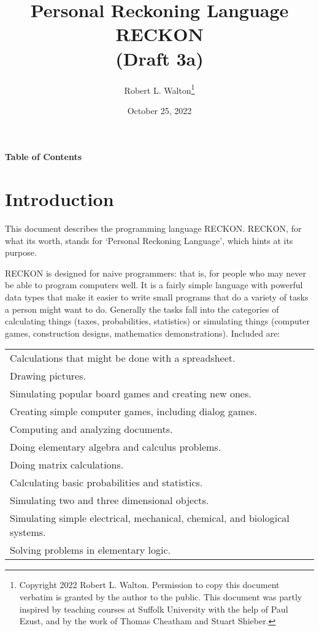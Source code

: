 \documentclass[12pt]{article}
\makeatletter
\renewcommand\tableofcontents{%
    \begin{list}{}%
	     {\setlength{\itemsep}{0in}%
	      \setlength{\topsep}{0in}%
	      \setlength{\parsep}{1ex}%
	      \setlength{\labelwidth}{0in}%
	      \setlength{\baselineskip}{1.5ex}%
	      \setlength{\leftmargin}{0.8in}%
	      \setlength{\rightmargin}{0.8in}}%
    \item\@starttoc{toc}%
    \end{list}}
\makeatother
\begin{document}
        
\title{Personal Reckoning Language\\[2ex]
       RECKON\\[2ex]
       (Draft 3a)}

\author{Robert L. Walton\thanks{Copyright 2022 Robert L. Walton.
Permission to copy this document verbatim is granted by the author
to the public.  This document was partly inspired
by teaching courses at Suffolk University with the help of
Paul Ezust, and by the work of Thomas
Cheatham and Stuart Shieber.}}

\date{October 25, 2022}

\maketitle

\newpage
\begin{center}
\large \bf Table of Contents
\end{center}

\bigskip

\tableofcontents 

\newpage

\section{Introduction}

This document describes the programming language RECKON.  RECKON,
for what its worth, stands for `Personal Reckoning Language',
which hints at its purpose.

RECKON is designed for naive programmers: that is, for people who may never
be able to program computers well.  It is a fairly simple language with
powerful data types that make it easier to write small programs
that do a variety of tasks a person might want to do.  Generally
the tasks fall into the categories of calculating things (taxes,
probabilities, statistics) or simulating things
(computer games, construction designs, mathematics demonstrations).
Included are:

\begin{center}
\begin{tabular}{l}
Calculations that might be done with a spreadsheet. \\
Drawing pictures. \\
Simulating popular board games and creating new ones. \\
Creating simple computer games, including dialog games. \\
Computing and analyzing documents. \\
Doing elementary algebra and calculus problems. \\
Doing matrix calculations. \\ 
Calculating basic probabilities and statistics. \\
Simulating two and three dimensional objects. \\
Simulating simple electrical, mechanical, chemical, and biological systems.\\
Solving problems in elementary logic. \\
\end{tabular}
\end{center}
\end{document}
